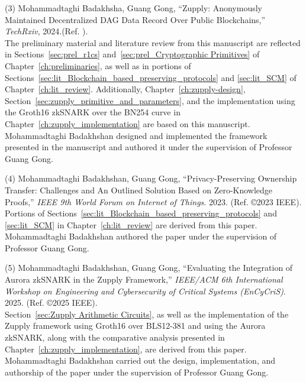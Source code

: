 \noindent (3) Mohammadtaghi Badakhsha, Guang Gong, ``Zupply: Anonymously Maintained Decentralized DAG Data Record Over Public Blockchains,'' \textit{TechRxiv}, 2024.(Ref. \cite{Badakhshan2024Zupply}). \\
The preliminary material and literature review from this manuscript are reflected in Sections~\ref{sec:prel_r1cs} and~\ref{sec:prel_Cryptographic Primitives} of Chapter~\ref{ch:preliminaries}, as well as in portions of Sections~\ref{sec:lit_Blockchain_based_preserving_protocols} and \ref{sec:lit_SCM} of Chapter~\ref{ch:lit_review}.
Additionally, Chapter~\ref{ch:zupply-design}, Section~\ref{sec:zupply_primitive_and_parameters}, and the implementation using the Groth16 zkSNARK over the BN254 curve in Chapter~\ref{ch:zupply_implementation} are based on this manuscript. Mohammadtaghi Badakhshan designed and implemented the framework presented in the manuscript and authored it under the supervision of Professor Guang Gong.

\noindent (4) Mohammadtaghi Badakhshan, Guang Gong, ``Privacy-Preserving Ownership Transfer: Challenges and An Outlined Solution Based on Zero-Knowledge Proofs,'' \textit{IEEE 9th World Forum on Internet of Things}. 2023. (Ref. \cite{Badakhshan2023Outline} \copyright \hspace{.1em}2023 IEEE).\\
Portions of Sections~\ref{sec:lit_Blockchain_based_preserving_protocols} and \ref{sec:lit_SCM} in Chapter~\ref{ch:lit_review} are derived from this paper. Mohammadtaghi Badakhshan authored the paper under the supervision of Professor Guang Gong.



\noindent (5) Mohammadtaghi Badakhshan, Guang Gong, ``Evaluating the Integration of {Aurora} {zkSNARK} in the {Zupply} Framework,'' \textit{IEEE/ACM 6th International Workshop on Engineering and Cybersecurity of Critical Systems (EnCyCriS)}. 2025. (Ref. \cite{Badakhshan2025AuroraZupply} \copyright \hspace{.1em}2025 IEEE).\\
Section~\ref{sec:Zupply Arithmetic Circuits}, as well as the implementation of the Zupply framework using Groth16 over BLS12-381 and using the Aurora zkSNARK, along with the comparative analysis presented in Chapter~\ref{ch:zupply_implementation}, are derived from this paper. Mohammadtaghi Badakhshan carried out the design, implementation, and authorship of the paper under the supervision of Professor Guang Gong.

\hfill



